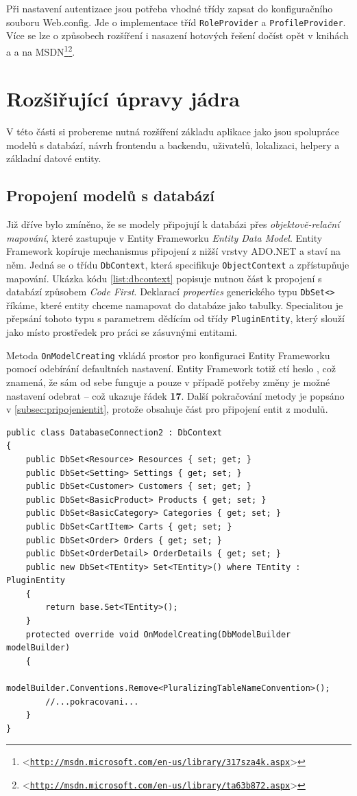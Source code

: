 \documentclass[11pt,twoside,a4paper]{book}
\let\oldUrl\url
\renewcommand\url[1]{<\texttt{\oldUrl{#1}}>}
\begin{document}
Při nastavení autentizace jsou potřeba vhodné třídy zapsat do konfiguračního souboru \textsf{Web.config}. Jde o implementace tříd \texttt{RoleProvider} a \texttt{ProfileProvider}. Více se lze o způsobech rozšíření i nasazení hotových řešení dočíst opět v knihách \cite{MVC1} a \cite{MVC2} a na MSDN\footnote{\url{http://msdn.microsoft.com/en-us/library/317sza4k.aspx}}\footnote{\url{http://msdn.microsoft.com/en-us/library/ta63b872.aspx}}.

\section{Rozšiřující úpravy jádra}
\label{sec:roz}
V této části si probereme nutná rozšíření základu aplikace jako jsou spolupráce modelů s databází, návrh frontendu a backendu, uživatelů, lokalizaci, helpery a základní datové entity.


\subsection{Propojení modelů s databází}
Již dříve bylo zmíněno, že se modely připojují k databázi přes \textit{objektově-relační mapování}, které zastupuje v Entity Frameworku \textit{Entity Data Model}. Entity Framework kopíruje mechanismus připojení z nižší vrstvy ADO.NET a staví na něm. Jedná se o třídu \texttt{DbContext}, která specifikuje \texttt{ObjectContext} a zpřístupňuje mapování. Ukázka kódu \ref{list:dbcontext} popisuje nutnou část k propojení s databází způsobem \textit{Code First}. Deklarací \textit{properties} generického typu \texttt{DbSet<>} říkáme, které entity chceme namapovat do databáze jako tabulky. Specialitou je přepsání tohoto typu s parametrem dědícím od třídy \texttt{PluginEntity}, který slouží jako místo prostředek pro práci se zásuvnými entitami.

Metoda \texttt{OnModelCreating} vkládá prostor pro konfiguraci Entity Frameworku pomocí odebírání defaultních nastavení. Entity Framework totiž ctí heslo , což znamená, že sám od sebe funguje a pouze v případě potřeby změny je možné nastavení odebrat -- což ukazuje řádek \textbf{17}. Další pokračování metody je popsáno v \ref{subsec:pripojenientit}, protože obsahuje část pro připojení entit z modulů.

\begin{lstlisting}[float=h!,language=CSharp, caption={Specifikace třídy DbContext}, label=list:dbcontext]
public class DatabaseConnection2 : DbContext
{
    public DbSet<Resource> Resources { set; get; }
    public DbSet<Setting> Settings { get; set; }
    public DbSet<Customer> Customers { set; get; }
    public DbSet<BasicProduct> Products { get; set; }
    public DbSet<BasicCategory> Categories { get; set; }
    public DbSet<CartItem> Carts { get; set; }
    public DbSet<Order> Orders { get; set; }
    public DbSet<OrderDetail> OrderDetails { get; set; }
    public new DbSet<TEntity> Set<TEntity>() where TEntity : PluginEntity
    {
        return base.Set<TEntity>();
    }
    protected override void OnModelCreating(DbModelBuilder modelBuilder)
    {
        modelBuilder.Conventions.Remove<PluralizingTableNameConvention>();
        //...pokracovani...
	}
}
\end{lstlisting}
\end{document}
